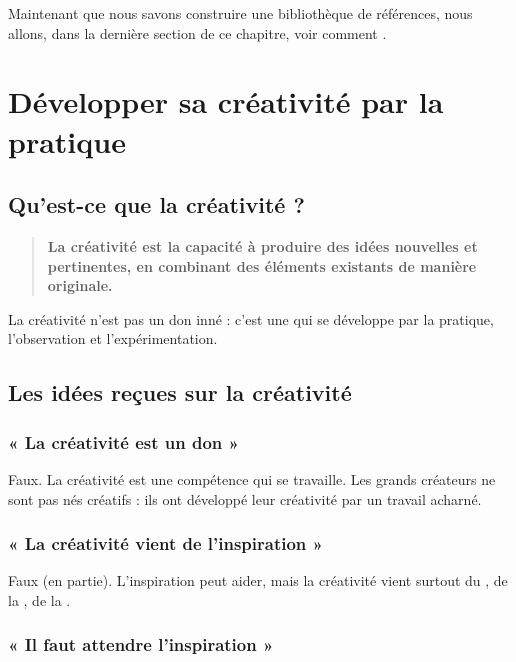 Maintenant que nous savons construire une bibliothèque de références, nous allons, dans la dernière section de ce chapitre, voir comment .

\section{Développer sa créativité par la pratique}

\subsection{Qu'est-ce que la créativité ?}

\begin{quote}
\textbf{La créativité est la capacité à produire des idées nouvelles et pertinentes, en combinant des éléments existants de manière originale.}
\end{quote}

La créativité n'est pas un don inné : c'est une  qui se développe par la pratique, l'observation et l'expérimentation.

\subsection{Les idées reçues sur la créativité}

\subsubsection{« La créativité est un don »}

Faux. La créativité est une compétence qui se travaille. Les grands créateurs ne sont pas nés créatifs : ils ont développé leur créativité par un travail acharné.

\subsubsection{« La créativité vient de l'inspiration »}

Faux (en partie). L'inspiration peut aider, mais la créativité vient surtout du , de la , de la .

\subsubsection{« Il faut attendre l'inspiration »}

